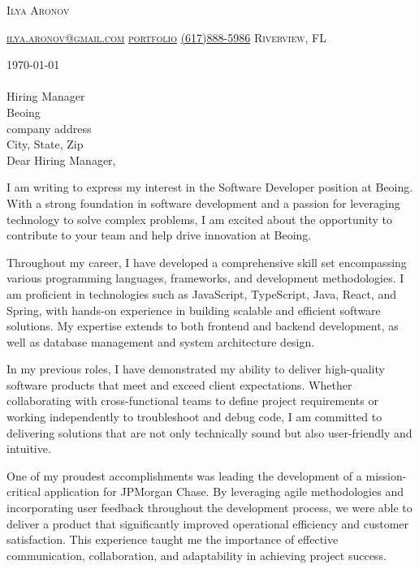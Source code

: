 \documentclass[11pt]{letter}
\makeatletter
\def\myemail{ilya.aronov@gmail.com}
\def\myname{Ilya Aronov}
\def\mylinkedin{ilya-aronov-b488a965}
\def\portfolio{https://imaronov.github.io/}
\def\myphone{(617)888-5986}
\def\mylocation{Riverview, FL}
\def\hiringManager{Hiring Manager}
\def\companyName{Beoing}
\def\companyAddress{company address}
\def\companyCity{City, State, Zip}
\def\previousCompany{JPMorgan Chase}
\def\companySkills{JavaScript, TypeScript, Java, React, and Spring}
\newcommand{\addressHeading}[4]{
    {#1}\\
    {#2}\\
    {#3}\\
    {#4}\\
}
\newcommand{\greeting}{
    \vspace{-0.1in}Dear \hiringManager,
}
\makeatother
\begin{document}
\AddToShipoutPictureBG{%
\color{gr}
\AtPageUpperLeft{\rule[-1.3in]{\paperwidth}{1.3in}}
}

\begin{center}
{\fontsize{28}{0}\selectfont\scshape \myname}

\fontsize{10}{0}\selectfont\scshape \href{mailto:\myemail}{\faEnvelope\enspace \myemail}\hfill
\fontsize{10}{0}\selectfont\scshape \href{\portfolio}{\faUser\enspace portfolio}\hfill
\fontsize{10}{0}\selectfont\scshape \href{tel:\myphone}{\faPhone\enspace \myphone}\hfill
\fontsize{10}{0}\selectfont\scshape \faMapMarker\enspace \mylocation
\end{center}

\vspace{0.2in}

\today
\\ \\
\addressHeading{\hiringManager}{\companyName}{\companyAddress}{\companyCity}

\greeting

I am writing to express my interest in the Software Developer position at \companyName.
With a strong foundation in software development and a passion for leveraging technology to solve complex problems,
I am excited about the opportunity to contribute to your team and help drive innovation at \companyName.

Throughout my career, I have developed a comprehensive skill set encompassing various programming languages, frameworks, and development methodologies.
I am proficient in technologies such as \companySkills, with hands-on experience in building scalable and efficient software solutions.
My expertise extends to both frontend and backend development, as well as database management and system architecture design.

In my previous roles, I have demonstrated my ability to deliver high-quality software products that meet and exceed client expectations.
Whether collaborating with cross-functional teams to define project requirements or working independently to troubleshoot and debug code,
I am committed to delivering solutions that are not only technically sound but also user-friendly and intuitive.

One of my proudest accomplishments was leading the development of a mission-critical application for \previousCompany.
By leveraging agile methodologies and incorporating user feedback throughout the development process, we were able to deliver a product that significantly improved operational efficiency and customer satisfaction.
This experience taught me the importance of effective communication, collaboration, and adaptability in achieving project success.
\end{document}
